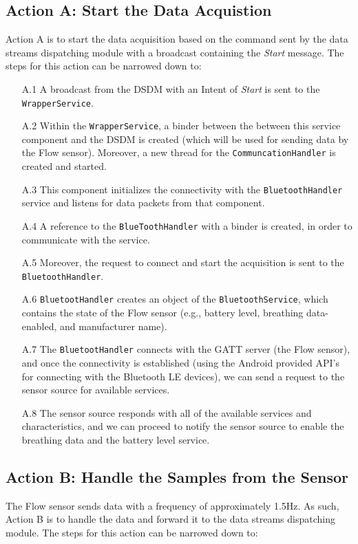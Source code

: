 \subsection{Action A: Start the Data Acquistion}
Action A is to start the data acquisition based on the command sent by the data streams dispatching module with a broadcast containing the \textit{Start} message. The steps for this action can be narrowed down to:

\begin{itemize}
    \item[A.1] A broadcast from the DSDM with an Intent of \textit{Start} is sent to the \verb|WrapperService|.
    \item[A.2] Within the \verb|WrapperService|, a binder between the between this service component and the DSDM is created (which will be used for sending data by the Flow sensor). Moreover, a new thread for the \verb|CommuncationHandler| is created and started.
    \item[A.3] This component initializes the connectivity with the \verb|BluetoothHandler| service and listens for data packets from that component.
    \item[A.4] A reference to the \verb|BlueToothHandler| with a binder is created, in order to communicate with the service. 
    \item[A.5] Moreover, the request to connect and start the acquisition is sent to the \verb|BluetoothHandler|. 
    \item[A.6] \verb|BluetootHandler| creates an object of the \verb|BluetoothService|, which contains the state of the Flow sensor (e.g., battery level, breathing data-enabled, and manufacturer name). 
    \item[A.7] The \verb|BluetootHandler| connects with the GATT server (the Flow sensor), and once the connectivity is established (using the Android provided API's for connecting with the Bluetooth LE devices), we can send a request to the sensor source for available services. 
    \item[A.8] The sensor source responds with all of the available services and characteristics, and we can proceed to notify the sensor source to enable the breathing data and the battery level service.  
\end{itemize}


\subsection{Action B: Handle the Samples from the Sensor}
The Flow sensor sends data with a frequency of approximately 1.5Hz. As such, Action B is to handle the data and forward it to the data streams dispatching module. The steps for this action can be narrowed down to:

